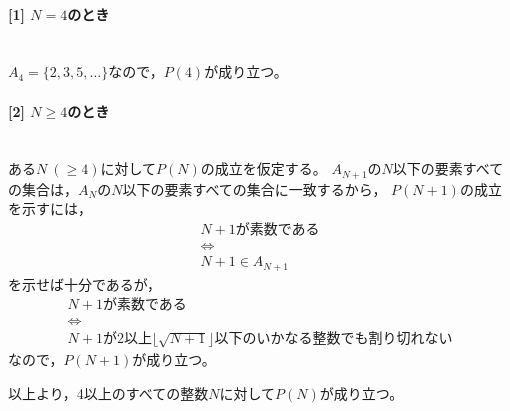 \documentclass{article}
\newcommand{\myparagraph}[1]{\paragraph{#1}\mbox{}\\}
\begin{document}
\myparagraph{[1] $N = 4$のとき}

$A_4 = \{2, 3, 5, \ldots \}$なので，$P(4)$が成り立つ。

\myparagraph{[2] $N \geq 4$のとき}

ある$N\ (\geq 4)$に対して$P(N)$の成立を仮定する。
$A_{N + 1}$の$N$以下の要素すべての集合は，$A_N$の$N$以下の要素すべての集合に一致するから，
$P(N + 1)$の成立を示すには，
\begin{gather}
    \mbox{$N + 1$が素数である} \\
    \Longleftrightarrow \\
    N + 1 \in A_{N + 1}
\end{gather}
を示せば十分であるが，
\begin{gather}
    \mbox{$N + 1$が素数である} \\
    \Longleftrightarrow \\
    \mbox{$N + 1$が2以上$\lfloor \sqrt{N + 1} \rfloor$以下のいかなる整数でも割り切れない}
\end{gather}
なので，$P(N + 1)$が成り立つ。

以上より，4以上のすべての整数$N$に対して$P(N)$が成り立つ。
\end{document}
